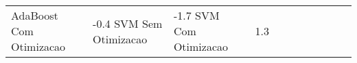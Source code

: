 \begin{table}[H]
\begin{adjustwidth}{ -1in }{ -1in }
\begin{tabular}{lllllllllll}
           AdaBoost Com Otimizacao &      -0.4%
                SVM Sem Otimizacao &      -1.7%
                SVM Com Otimizacao &       1.3%
\bottomrule
\end{tabular}
    \end{adjustwidth}
    \renewcommand{\arraystretch}{1.0} %
\end{table}
